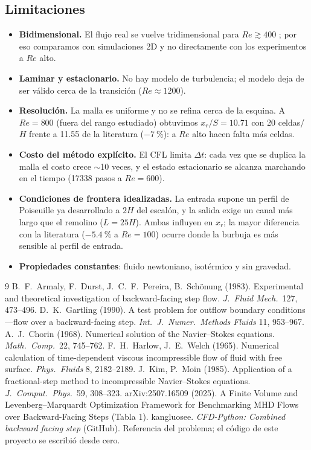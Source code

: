 \documentclass[11pt,letterpaper]{article}
\newcommand{\Rey}{\mathit{Re}}
\begin{document}
\subsection{Limitaciones}
\begin{itemize}
  \item \textbf{Bidimensional.} El flujo real se vuelve tridimensional para $\Rey\gtrsim400$ \cite{armaly}; por eso
    comparamos con simulaciones 2D y no directamente con los experimentos a $\Rey$ alto.
  \item \textbf{Laminar y estacionario.} No hay modelo de turbulencia; el modelo deja de ser válido cerca de la transición
    ($\Rey\approx1200$).
  \item \textbf{Resolución.} La malla es uniforme y no se refina cerca de la esquina. A $\Rey=800$ (fuera del rango
    estudiado) obtuvimos $x_r/S=10.71$ con 20 celdas/$H$ frente a 11.55 de la literatura ($-\SI{7}{\percent}$): a
    $\Rey$ alto hacen falta más celdas.
  \item \textbf{Costo del método explícito.} El CFL limita $\Delta t$: cada vez que se duplica la malla el costo crece
    $\sim$10 veces, y el estado estacionario se alcanza marchando en el tiempo (\num{17338} pasos a $\Rey=600$).
  \item \textbf{Condiciones de frontera idealizadas.} La entrada supone un perfil de Poiseuille ya desarrollado a $2H$ del
    escalón, y la salida exige un canal más largo que el remolino ($L=25H$). Ambas influyen en $x_r$; la mayor
    diferencia con la literatura ($-\SI{5.4}{\percent}$ a $\Rey=100$) ocurre donde la burbuja es más sensible al perfil
    de entrada.
  \item \textbf{Propiedades constantes}: fluido newtoniano, isotérmico y sin gravedad.
\end{itemize}

\begin{thebibliography}{9}\small
{} B.~F.~Armaly, F.~Durst, J.~C.~F.~Pereira, B.~Schönung (1983). Experimental and theoretical
  investigation of backward-facing step flow. \emph{J.\ Fluid Mech.}\ 127, 473--496.
 D.~K.~Gartling (1990). A test problem for outflow boundary conditions---flow over a backward-facing
  step. \emph{Int.\ J.\ Numer.\ Methods Fluids} 11, 953--967.
 A.~J.~Chorin (1968). Numerical solution of the Navier–Stokes equations. \emph{Math.\ Comp.}\ 22,
  745--762.
 F.~H.~Harlow, J.~E.~Welch (1965). Numerical calculation of time-dependent viscous incompressible flow
  of fluid with free surface. \emph{Phys.\ Fluids} 8, 2182--2189.
 J.~Kim, P.~Moin (1985). Application of a fractional-step method to incompressible Navier–Stokes
  equations. \emph{J.\ Comput.\ Phys.}\ 59, 308--323.
 arXiv:2507.16509 (2025). A Finite Volume and Levenberg–Marquardt Optimization Framework for
  Benchmarking MHD Flows over Backward-Facing Steps (Tabla 1).
 kangluosee. \emph{CFD-Python: Combined backward facing step} (GitHub). Referencia del problema; el
  código de este proyecto se escribió desde cero.
\end{thebibliography}
\end{document}
